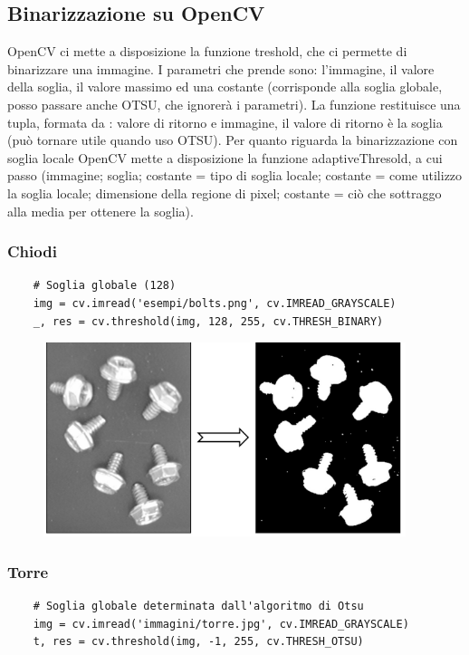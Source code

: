 \newpage

\subsection{Binarizzazione su OpenCV}
OpenCV ci mette a disposizione la funzione treshold, che ci permette di binarizzare una immagine. I parametri che prende sono: l'immagine, il valore della soglia, il valore massimo ed una costante (corrisponde alla soglia globale, posso passare anche OTSU, che ignorerà i parametri). La funzione restituisce una tupla, formata da : valore di ritorno e immagine, il valore di ritorno è la soglia (può tornare utile quando uso OTSU). Per quanto riguarda la binarizzazione con soglia locale OpenCV mette a disposizione la funzione adaptiveThresold, a cui passo (immagine; soglia; costante = tipo di soglia locale; costante = come utilizzo la soglia locale; dimensione della regione di pixel; costante = ciò che sottraggo alla media per ottenere la soglia).


\subsubsection{Chiodi}

\begin{lstlisting}
	# Soglia globale (128)
	img = cv.imread('esempi/bolts.png', cv.IMREAD_GRAYSCALE)
	_, res = cv.threshold(img, 128, 255, cv.THRESH_BINARY)
\end{lstlisting}

\begin{figure}[htp]
	\includegraphics[width=300pt]{./immagini/chiodi_binarizzati.png}
	\label{img:chiodi_binarizzati}
\end{figure}

\subsubsection{Torre}

\begin{lstlisting}
	# Soglia globale determinata dall'algoritmo di Otsu
	img = cv.imread('immagini/torre.jpg', cv.IMREAD_GRAYSCALE)
	t, res = cv.threshold(img, -1, 255, cv.THRESH_OTSU)
\end{lstlisting}

